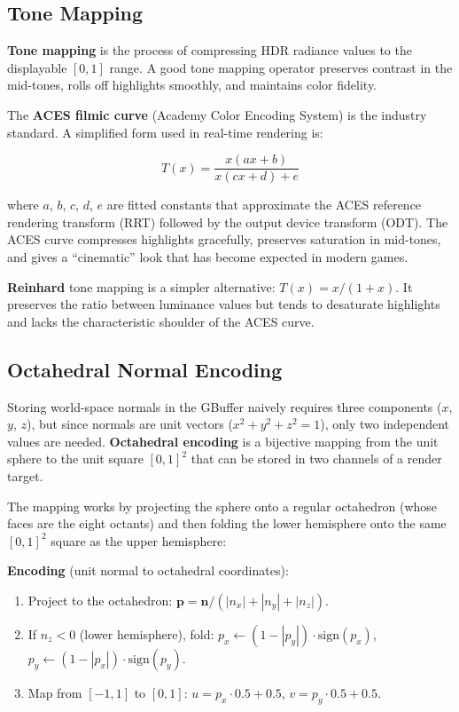 \documentclass[
  11pt,
  letterpaper,
  DIV=11,
  numbers=noendperiod,
  twoside,
  open=right]{scrreprt}
\providecommand{\tightlist}{%
  \setlength{\itemsep}{0pt}\setlength{\parskip}{0pt}}
\begin{document}
\subsection{Tone Mapping}\label{tone-mapping}

\textbf{Tone mapping} is the process of compressing HDR radiance values
to the displayable \([0, 1]\) range. A good tone mapping operator
preserves contrast in the mid-tones, rolls off highlights smoothly, and
maintains color fidelity.

The \textbf{ACES filmic curve} (Academy Color Encoding System) is the
industry standard. A simplified form used in real-time rendering is:

\[
T(x) = \frac{x(ax + b)}{x(cx + d) + e}
\]

where \(a\), \(b\), \(c\), \(d\), \(e\) are fitted constants that
approximate the ACES reference rendering transform (RRT) followed by the
output device transform (ODT). The ACES curve compresses highlights
gracefully, preserves saturation in mid-tones, and gives a ``cinematic''
look that has become expected in modern games.

\textbf{Reinhard} tone mapping is a simpler alternative:
\(T(x) = x / (1 + x)\). It preserves the ratio between luminance values
but tends to desaturate highlights and lacks the characteristic shoulder
of the ACES curve.

\subsection{Octahedral Normal
Encoding}\label{octahedral-normal-encoding}

Storing world-space normals in the GBuffer naively requires three
components (\(x\), \(y\), \(z\)), but since normals are unit vectors
(\(x^2 + y^2 + z^2 = 1\)), only two independent values are needed.
\textbf{Octahedral encoding} is a bijective mapping from the unit sphere
to the unit square \([0, 1]^2\) that can be stored in two channels of a
render target.

The mapping works by projecting the sphere onto a regular octahedron
(whose faces are the eight octants) and then folding the lower
hemisphere onto the same \([0, 1]^2\) square as the upper hemisphere:

\textbf{Encoding} (unit normal to octahedral coordinates):

\begin{enumerate}
\def\labelenumi{\arabic{enumi}.}
\tightlist
\item
  Project to the octahedron:
  \(\mathbf{p} = \mathbf{n} / (|n_x| + |n_y| + |n_z|)\).
\item
  If \(n_z < 0\) (lower hemisphere), fold:
  \(p_x \leftarrow (1 - |p_y|) \cdot \text{sign}(p_x)\),
  \(p_y \leftarrow (1 - |p_x|) \cdot \text{sign}(p_y)\).
\item
  Map from \([-1, 1]\) to \([0, 1]\): \(u = p_x \cdot 0.5 + 0.5\),
  \(v = p_y \cdot 0.5 + 0.5\).
\end{enumerate}
\end{document}
